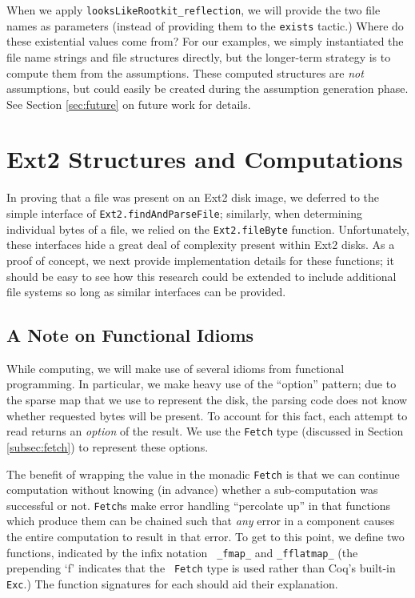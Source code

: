 \documentclass[nocopyrightspace,preprint]{sigplanconf}
\begin{document}
When we apply {\tt looksLikeRootkit\_reflection}, we will provide the two file
names as parameters (instead of providing them to the {\tt exists} tactic.)
Where do these existential values come from? For our examples, we simply
instantiated the file name strings and file structures directly, but the
longer-term strategy is to compute them from the assumptions. These computed
structures are {\em not} assumptions, but could easily be created during the
assumption generation phase. See Section \ref{sec:future} on future work for
details.

\section{Ext2 Structures and Computations}
\label{sec:ext2}

In proving that a file was present on an Ext2 disk image, we deferred to the
simple interface of {\tt Ext2.findAndParseFile}; similarly, when determining
individual bytes of a file, we relied on the {\tt Ext2.fileByte} function.
Unfortunately, these interfaces hide a great deal of complexity present within
Ext2 disks. As a proof of concept, we next provide implementation details for
these functions; it should be easy to see how this research could be extended
to include additional file systems so long as similar interfaces can be
provided.

\subsection{A Note on Functional Idioms}
\label{subsec:functionalext2}

While computing, we will make use of several idioms from functional
programming.  In particular, we make heavy use of the ``option'' pattern; due
to the sparse map that we use to represent the disk, the parsing code does not
know whether requested bytes will be present. To account for this fact, each
attempt to read returns an {\em option} of the result. We use the {\tt Fetch}
type (discussed in Section \ref{subsec:fetch}) to represent these options.

The benefit of wrapping the value in the monadic {\tt Fetch} is that we can
continue computation without knowing (in advance) whether a sub-computation
was successful or not. {\tt Fetch}s make error handling ``percolate up'' in
that functions which produce them can be chained such that {\em any} error in
a component causes the entire computation to result in that error. To get to
this point, we define two functions, indicated by the infix notation {\tt
\_fmap\_} and {\tt \_fflatmap\_} (the prepending `f' indicates that the {\tt
Fetch} type is used rather than Coq's built-in {\tt Exc}.) The function
signatures for each should aid their explanation.
\end{document}
